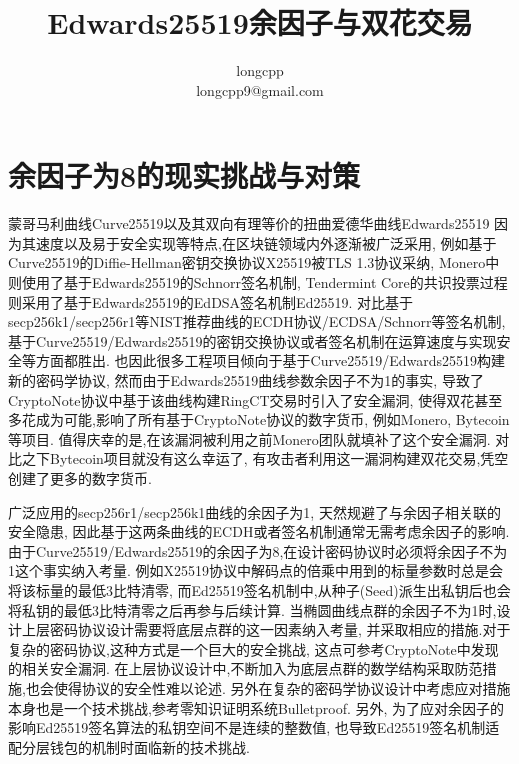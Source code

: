 \documentclass{article}
\begin{document}
\title{Edwards25519余因子与双花交易}
\author{longcpp \\ \small{longcpp9@gmail.com}}

\maketitle

\section{余因子为8的现实挑战与对策}

蒙哥马利曲线Curve25519以及其双向有理等价的扭曲爱德华曲线Edwards25519
因为其速度以及易于安全实现等特点,在区块链领域内外逐渐被广泛采用, 
例如基于Curve25519的Diffie-Hellman密钥交换协议X25519被TLS 1.3协议采纳, 
Monero中则使用了基于Edwards25519的Schnorr签名机制, 
Tendermint Core的共识投票过程则采用了基于Edwards25519的EdDSA签名机制Ed25519. 
对比基于secp256k1/secp256r1等NIST推荐曲线的ECDH协议/ECDSA/Schnorr等签名机制, 
基于Curve25519/Edwards25519的密钥交换协议或者签名机制在运算速度与实现安全等方面都胜出.
也因此很多工程项目倾向于基于Curve25519/Edwards25519构建新的密码学协议,
然而由于Edwards25519曲线参数余因子不为1的事实,
导致了CryptoNote协议中基于该曲线构建RingCT交易时引入了安全漏洞,
使得双花甚至多花成为可能,影响了所有基于CryptoNote协议的数字货币, 例如Monero, Bytecoin等项目. 
值得庆幸的是,在该漏洞被利用之前Monero团队就填补了这个安全漏洞. 
对比之下Bytecoin项目就没有这么幸运了, 有攻击者利用这一漏洞构建双花交易,凭空创建了更多的数字货币.

广泛应用的secp256r1/secp256k1曲线的余因子为1, 天然规避了与余因子相关联的安全隐患,
因此基于这两条曲线的ECDH或者签名机制通常无需考虑余因子的影响.
由于Curve25519/Edwards25519的余因子为8,在设计密码协议时必须将余因子不为1这个事实纳入考量.
例如X25519协议中解码点的倍乘中用到的标量参数时总是会将该标量的最低3比特清零,
而Ed25519签名机制中,从种子(Seed)派生出私钥后也会将私钥的最低3比特清零之后再参与后续计算.
当椭圆曲线点群的余因子不为1时,设计上层密码协议设计需要将底层点群的这一因素纳入考量,
并采取相应的措施.对于复杂的密码协议,这种方式是一个巨大的安全挑战, 
这点可参考CryptoNote中发现的相关安全漏洞.
在上层协议设计中,不断加入为底层点群的数学结构采取防范措施,也会使得协议的安全性难以论述.
另外在复杂的密码学协议设计中考虑应对措施本身也是一个技术挑战,参考零知识证明系统Bulletproof. 
另外, 为了应对余因子的影响Ed25519签名算法的私钥空间不是连续的整数值, 
也导致Ed25519签名机制适配分层钱包的机制时面临新的技术挑战.
\end{document}
